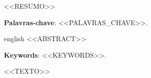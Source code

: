 \documentclass[12pt, oneside, a4paper, chapter=TITLE, section=TITLE, sumario=abnt-6027-2012, english, brazil]{abntex2}
\begin{document}
\frenchspacing

\imprimircapa
\imprimirfolhaderosto*

\begin{resumo}
<<RESUMO>>

\textbf{Palavras-chave}: <<PALAVRAS_CHAVE>>.
\end{resumo}

\begin{resumo}[Abstract]
\begin{otherlanguage*}{english}
<<ABSTRACT>>

\vspace{\onelineskip}
\noindent\textbf{Keywords}: <<KEYWORDS>>.
\end{otherlanguage*}
\end{resumo}

\tableofcontents*
\cleardoublepage

\textual

<<TEXTO>>

\postextual

\end{document}
